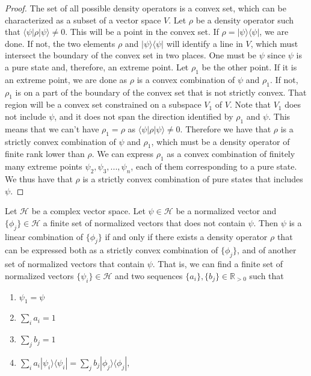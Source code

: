 \documentclass[10pt,twocolumn, nofootinbib]{revtex4-2}
\def\>{\rangle}
\def\<{\langle}
\begin{document}
\begin{proof}
The set of all possible density operators is a convex set, which can be characterized as a subset of a vector space $V$. Let $\rho$ be a density operator such that $\<\psi|\rho|\psi\>\neq 0$. This will be a point in the convex set. If $\rho = |\psi\>\<\psi|$, we are done. If not, the two elements $\rho$ and $|\psi\>\<\psi|$ will identify a line in $V$, which must intersect the boundary of the convex set in two places. One must be $\psi$ since $\psi$ is a pure state and, therefore, an extreme point. Let $\rho_1$ be the other point. If it is an extreme point, we are done as $\rho$ is a convex combination of $\psi$ and $\rho_1$. If not, $\rho_1$ is on a part of the boundary of the convex set that is not strictly convex. That region will be a convex set constrained on a subspace $V_1$ of $V$. Note that $V_1$ does not include $\psi$, and it does not span the direction identified by $\rho_1$ and $\psi$. This means that we can't have $\rho_1 = \rho$ as $\<\psi|\rho|\psi\>\neq 0$. Therefore we have that $\rho$ is a strictly convex combination of $\psi$ and $\rho_1$, which must be a density operator of finite rank lower than $\rho$. We can express $\rho_1$ as a convex combination of finitely many extreme points $\psi_2, \psi_3, ..., \psi_n$, each of them corresponding to a pure state. We thus have that $\rho$ is a strictly convex combination of pure states that includes $\psi$.
\end{proof}

\begin{prop}\label{prop_superpositionIsDecomposition}
Let $\mathcal{H}$ be a complex vector space. Let $\psi \in \mathcal{H}$ be a normalized vector and $\{\phi_j\} \in \mathcal{H}$ a finite set of normalized vectors that does not contain $\psi$. Then $\psi$ is a linear combination of $\{\phi_j\}$ if and only if there exists a density operator $\rho$ that can be expressed both as a strictly convex combination of $\{\phi_j\}$, and of another set of normalized vectors that contain $\psi$. That is, we can find a finite set of normalized vectors $\{\psi_i\} \in \mathcal{H}$ and two sequences $\{a_i\}, \{b_j\} \in \mathbb{R}_{>0}$ such that
\begin{enumerate}
\item $\psi_1 = \psi$
\item $\sum_i a_i = 1$
\item $\sum_j b_j = 1$
\item $\sum_i a_i |\psi_i\>\<\psi_i| = \sum_j b_j |\phi_j\>\<\phi_j|$,
\end{enumerate}
\end{prop}
\end{document}
